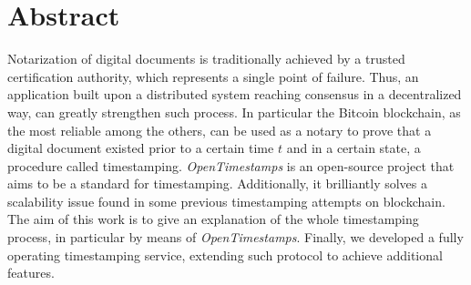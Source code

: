 \chapter{Abstract}
Notarization of digital documents is traditionally achieved by a trusted certification authority, which represents a single point of failure. Thus, an application built upon a distributed system reaching consensus in a decentralized way, can greatly strengthen such process. In particular the Bitcoin blockchain, as the most reliable among the others, can be used as a notary to prove that a digital document existed prior to a certain time $t$ and in a certain state, a procedure called timestamping. \textit{OpenTimestamps} is an open-source project that aims to be a standard for timestamping. Additionally, it brilliantly solves a scalability issue found in some previous timestamping attempts on blockchain. The aim of this work is to give an explanation of the whole timestamping process, in particular by means of \textit{OpenTimestamps}. Finally, we developed a fully operating timestamping service, extending such protocol to achieve additional features.